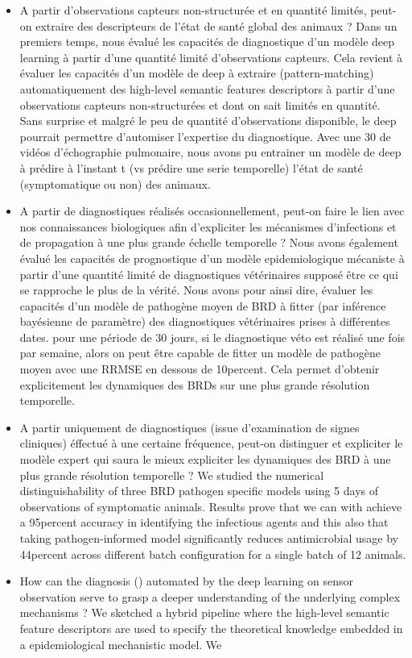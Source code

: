  \begin{itemize}
     \item A partir d'observations capteurs non-structurée et en quantité limités, peut-on extraire des descripteurs de l'état de santé global des animaux ? 
     Dans un premiers temps, nous évalué les capacités de diagnostique d'un modèle deep learning à partir d'une quantité limité d'observations capteurs. Cela revient à évaluer les capacités d'un modèle de deep à extraire (pattern-matching) automatiquement des high-level semantic features descriptors à partir d'une observations capteurs non-structurées et dont on sait limités en quantité. 
     Sans surprise et malgré le peu de quantité d'observations disponible, le deep pourrait permettre d'automiser l'expertise du diagnostique. Avec une 30 de vidéos d'échographie pulmonaire, nous avons pu entrainer un modèle de deep à prédire à l'instant t (vs prédire une serie temporelle) l'état de santé (symptomatique ou non) des animaux. 
     \item A partir de diagnostiques réalisés occasionnellement, peut-on faire le lien avec nos connaissances biologiques afin d'expliciter les mécanismes d'infections et de propagation à une plus grande échelle temporelle ?  
     Nous avons également évalué les capacités de prognostique d'un modèle epidemiologique mécaniste à partir d'une quantité limité de diagnostiques vétérinaires supposé être ce qui se rapproche le plus de la vérité. Nous avons pour ainsi dire, évaluer les capacités d'un modèle de pathogène moyen de BRD à fitter (par inférence bayésienne de paramètre) des diagnostiques vétérinaires prises à différentes dates. pour une période de 30 jours, si le diagnostique véto est réalisé une fois par semaine, alors on peut être capable de fitter un modèle de pathogène moyen avec une RRMSE en dessous de 10percent. Cela permet d'obtenir explicitement les dynamiques des BRDs sur une plus grande résolution temporelle.
     \item A partir uniquement de diagnostiques (issue d'examination de signes cliniques) éffectué à une certaine fréquence, peut-on  distinguer et expliciter le modèle expert qui saura le mieux expliciter les dynamiques des BRD à une plus grande résolution temporelle ? We studied the numerical distinguishability of three BRD pathogen specific models using 5 days of observations of symptomatic animals. Results prove that we can with achieve a 95percent accuracy in identifying the infectious agents and this also that taking pathogen-informed model significantly reduces antimicrobial usage by 44percent across different batch configuration for a single batch of 12 animals.
     \item How can the diagnosis () automated by the deep learning on sensor observation serve to grasp a deeper understanding of the underlying complex mechanisms ? We sketched a hybrid pipeline where the high-level semantic feature descriptors are used to specify the theoretical knowledge embedded in a epidemiological mechanistic model. We 
     
 \end{itemize}




